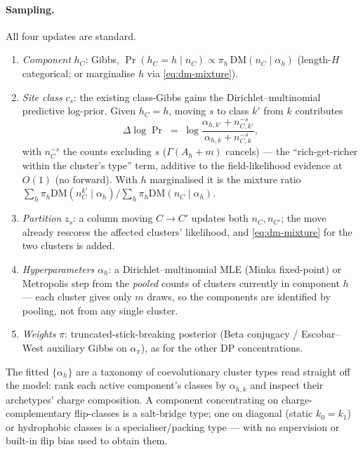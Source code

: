\paragraph{Sampling.} All four updates are standard.
\begin{enumerate}
  \item \emph{Component} $h_C$: Gibbs, $\Pr(h_C=h\mid n_C)\propto
    \pi_h\,\mathrm{DM}(n_C\mid\alpha_h)$ (length-$H$ categorical; or marginalise
    $h$ via \eqref{eq:dm-mixture}).
  \item \emph{Site class} $c_s$: the existing class-Gibbs gains the
    Dirichlet--multinomial predictive log-prior. Given $h_C=h$, moving $s$ to
    class $k'$ from $k$ contributes
    \begin{equation}
      \Delta\log\Pr \;=\; \log\frac{\alpha_{h,k'}+n^{-s}_{C,k'}}
                                   {\alpha_{h,k}+n^{-s}_{C,k}},
      \label{eq:dm-cn}
    \end{equation}
    with $n^{-s}_C$ the counts excluding $s$ ($\Gamma(A_h+m)$ cancels) --- the
    ``rich-get-richer within the cluster's type'' term, additive to the
    field-likelihood evidence at $O(1)$ (no forward). With $h$ marginalised it
    is the mixture ratio
    $\sum_h\pi_h\mathrm{DM}(n^{k'}_C\mid\alpha_h)\big/
    \sum_h\pi_h\mathrm{DM}(n_C\mid\alpha_h)$.
  \item \emph{Partition} $z_s$: a column moving $C\!\to\!C'$ updates both
    $n_C,n_{C'}$; the move already rescores the affected clusters' likelihood,
    and \eqref{eq:dm-mixture} for the two clusters is added.
  \item \emph{Hyperparameters} $\alpha_h$: a Dirichlet--multinomial MLE (Minka
    fixed-point) or Metropolis step from the \emph{pooled} counts of clusters
    currently in component $h$ --- each cluster gives only $m$ draws, so the
    components are identified by pooling, not from any single cluster.
  \item \emph{Weights} $\pi$: truncated-stick-breaking posterior (Beta
    conjugacy / Escobar--West auxiliary Gibbs on $\alpha_\pi$), as for the other
    DP concentrations.
\end{enumerate}

\begin{remark}[Interpretability]
The fitted $\{\alpha_h\}$ are a taxonomy of coevolutionary cluster types read
straight off the model: rank each active component's classes by $\alpha_{h,k}$
and inspect their archetypes' charge composition. A component concentrating on
charge-complementary flip-classes is a salt-bridge type; one on diagonal
(static $k_0=k_1$) or hydrophobic classes is a specialiser/packing type --- with
no supervision or built-in flip bias used to obtain them.
\end{remark}

